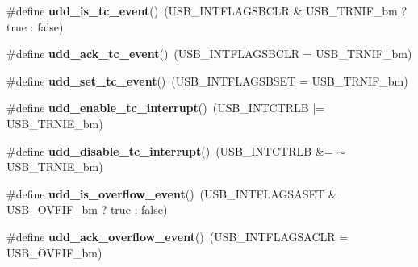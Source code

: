 \begin{DoxyCompactItemize}
\item 
\hypertarget{group__udd__xmega__usb__group_ga03050d605265e69f71a64ac033ae15b8}{\#define {\bfseries udd\-\_\-is\-\_\-tc\-\_\-event}()~(U\-S\-B\-\_\-\-I\-N\-T\-F\-L\-A\-G\-S\-B\-C\-L\-R \& U\-S\-B\-\_\-\-T\-R\-N\-I\-F\-\_\-bm ? true \-: false)}\label{group__udd__xmega__usb__group_ga03050d605265e69f71a64ac033ae15b8}

\item 
\hypertarget{group__udd__xmega__usb__group_ga264546cf9d1bc9eedb4541b910d80e95}{\#define {\bfseries udd\-\_\-ack\-\_\-tc\-\_\-event}()~(U\-S\-B\-\_\-\-I\-N\-T\-F\-L\-A\-G\-S\-B\-C\-L\-R = U\-S\-B\-\_\-\-T\-R\-N\-I\-F\-\_\-bm)}\label{group__udd__xmega__usb__group_ga264546cf9d1bc9eedb4541b910d80e95}

\item 
\hypertarget{group__udd__xmega__usb__group_ga85eb5bb2e059c439220034993517023b}{\#define {\bfseries udd\-\_\-set\-\_\-tc\-\_\-event}()~(U\-S\-B\-\_\-\-I\-N\-T\-F\-L\-A\-G\-S\-B\-S\-E\-T = U\-S\-B\-\_\-\-T\-R\-N\-I\-F\-\_\-bm)}\label{group__udd__xmega__usb__group_ga85eb5bb2e059c439220034993517023b}

\item 
\hypertarget{group__udd__xmega__usb__group_gaa48973d78b4aefb73712d669d7ab9a06}{\#define {\bfseries udd\-\_\-enable\-\_\-tc\-\_\-interrupt}()~(U\-S\-B\-\_\-\-I\-N\-T\-C\-T\-R\-L\-B $|$= U\-S\-B\-\_\-\-T\-R\-N\-I\-E\-\_\-bm)}\label{group__udd__xmega__usb__group_gaa48973d78b4aefb73712d669d7ab9a06}

\item 
\hypertarget{group__udd__xmega__usb__group_ga98f8847bdcd737e53e3fb35188c8b749}{\#define {\bfseries udd\-\_\-disable\-\_\-tc\-\_\-interrupt}()~(U\-S\-B\-\_\-\-I\-N\-T\-C\-T\-R\-L\-B \&= $\sim$U\-S\-B\-\_\-\-T\-R\-N\-I\-E\-\_\-bm)}\label{group__udd__xmega__usb__group_ga98f8847bdcd737e53e3fb35188c8b749}

\item 
\hypertarget{group__udd__xmega__usb__group_gad4bd1a0864df510048f5ab0c73cc113e}{\#define {\bfseries udd\-\_\-is\-\_\-overflow\-\_\-event}()~(U\-S\-B\-\_\-\-I\-N\-T\-F\-L\-A\-G\-S\-A\-S\-E\-T \& U\-S\-B\-\_\-\-O\-V\-F\-I\-F\-\_\-bm ? true \-: false)}\label{group__udd__xmega__usb__group_gad4bd1a0864df510048f5ab0c73cc113e}

\item 
\hypertarget{group__udd__xmega__usb__group_gad742e99333404f09c5d5d3f2cf7afb32}{\#define {\bfseries udd\-\_\-ack\-\_\-overflow\-\_\-event}()~(U\-S\-B\-\_\-\-I\-N\-T\-F\-L\-A\-G\-S\-A\-C\-L\-R = U\-S\-B\-\_\-\-O\-V\-F\-I\-F\-\_\-bm)}\label{group__udd__xmega__usb__group_gad742e99333404f09c5d5d3f2cf7afb32}


\end{DoxyCompactItemize}
